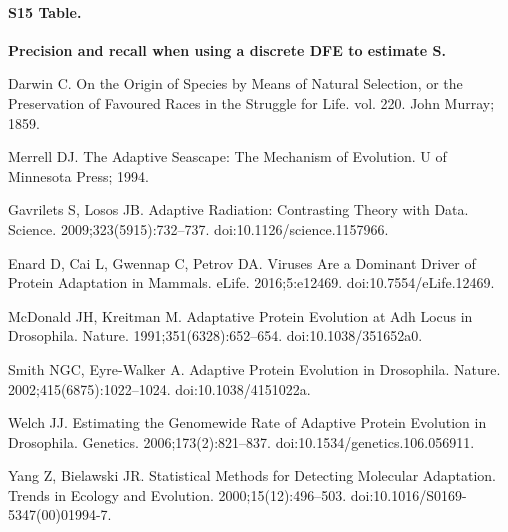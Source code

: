 \documentclass[10pt,letterpaper]{article}
\newcommand{\Spop}{S}
\begin{document}
\paragraph*{S15 Table.}
\label{S15_Table}
{\bf Precision and recall when using a discrete DFE to estimate $\bm{\Spop}$.}


%
%
%
\begin{thebibliography}{10}

Darwin C.
\newblock On the {{Origin}} of {{Species}} by {{Means}} of {{Natural
Selection}}, or the {{Preservation}} of {{Favoured Races}} in the
{{Struggle}} for {{Life}}. vol. 220.
\newblock John Murray; 1859.

Merrell DJ.
\newblock The {{Adaptive Seascape}}: {{The Mechanism}} of {{Evolution}}.
\newblock U of Minnesota Press; 1994.

Gavrilets S, Losos JB.
\newblock Adaptive {{Radiation}}: {{Contrasting Theory}} with {{Data}}.
\newblock Science. 2009;323(5915):732--737.
\newblock doi:{10.1126/science.1157966}.

Enard D, Cai L, Gwennap C, Petrov DA.
\newblock Viruses Are a Dominant Driver of Protein Adaptation in Mammals.
\newblock eLife. 2016;5:e12469.
\newblock doi:{10.7554/eLife.12469}.

McDonald JH, Kreitman M.
\newblock Adaptative Protein Evolution at {{Adh}} Locus in {{Drosophila}}.
\newblock Nature. 1991;351(6328):652--654.
\newblock doi:{10.1038/351652a0}.

Smith NGC, {Eyre-Walker} A.
\newblock Adaptive Protein Evolution in {{Drosophila}}.
\newblock Nature. 2002;415(6875):1022--1024.
\newblock doi:{10.1038/4151022a}.

Welch JJ.
\newblock Estimating the {{Genomewide Rate}} of {{Adaptive Protein Evolution}}
in {{Drosophila}}.
\newblock Genetics. 2006;173(2):821--837.
\newblock doi:{10.1534/genetics.106.056911}.

Yang Z, Bielawski JR.
\newblock Statistical Methods for Detecting Molecular Adaptation.
\newblock Trends in Ecology and Evolution. 2000;15(12):496--503.
\newblock doi:{10.1016/S0169-5347(00)01994-7}.


\end{thebibliography}
\end{document}
